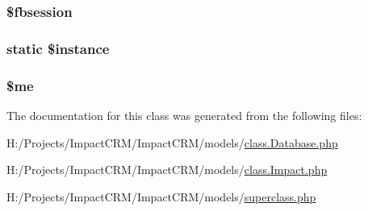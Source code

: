\label{classImpact__Superclass_a4b9bb5e9f7a5ea9381bdbe31c44e9339}
\hypertarget{classImpact__Superclass_a92c4441a7b5fe8069992f5a4a29f24fe}{
\subsubsection[{\$fbsession}]{\setlength{\rightskip}{0pt plus 5cm}\$fbsession}}
\label{classImpact__Superclass_a92c4441a7b5fe8069992f5a4a29f24fe}
\hypertarget{classImpact__Superclass_a6438a1b53245abfe71a285472f24934d}{
\subsubsection[{\$instance}]{\setlength{\rightskip}{0pt plus 5cm}static \$instance}}
\label{classImpact__Superclass_a6438a1b53245abfe71a285472f24934d}
\hypertarget{classImpact__Superclass_ad856a60cee1894f180e845f9b7b81458}{
\subsubsection[{\$me}]{\setlength{\rightskip}{0pt plus 5cm}\$me}}
\label{classImpact__Superclass_ad856a60cee1894f180e845f9b7b81458}


The documentation for this class was generated from the following files:\begin{DoxyCompactItemize}
\item 
H:/Projects/ImpactCRM/ImpactCRM/models/\hyperlink{class_8Database_8php}{class.Database.php}\item 
H:/Projects/ImpactCRM/ImpactCRM/models/\hyperlink{class_8Impact_8php}{class.Impact.php}\item 
H:/Projects/ImpactCRM/ImpactCRM/models/\hyperlink{superclass_8php}{superclass.php}\end{DoxyCompactItemize}
